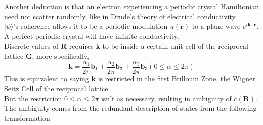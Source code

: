 \documentclass{article}
\begin{document}
Another deduction is that an electron experiencing a periodic crystal Hamiltonian need not scatter randomly, like in Drude's theory of electrical conductivity.\\
$|\psi\rangle$'s coherence allows it to be a periodic modulation $u(\mathbf{r})$ to a plane wave $e^{i\mathbf{k}\cdot\mathbf{r}}$. A perfect periodic crystal will have infinite conductivity.\\
Discrete values of $\mathbf{R}$ requires $\mathbf{k}$ to be inside a certain unit cell of the reciprocal lattice $\mathbf{G}$, more specifically,
\begin{equation}
	\mathbf{k}=\frac{\alpha_{1}}{2\pi}\mathbf{b}_{1}+\frac{\alpha_{2}}{2\pi}\mathbf{b_{2}}+\frac{\alpha_{3}}{2\pi}\mathbf{b}_{3}(0\leq\alpha\leq2\pi)\label{kG}
\end{equation}
This is equivalent to saying $\mathbf{k}$ is restricted in the first Brillouin Zone, the Wigner Seitz Cell of the reciprocal lattice.\\
But the restriction $0\leq\alpha\leq2\pi$ isn't as necessary, rsulting in ambiguity of $c(\mathbf{R})$. The ambiguity comes from the redundant description of states from the following transformation
\end{document}
